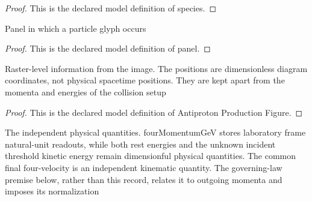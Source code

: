 \begin{proof}
  This is the declared model definition of species.
\end{proof}
\begin{definition}[panel]
  \label{def:physics:phyx-mini-0555:phyxminiproblems-problemphyxmini0555-figureparticleglyph-panel}
  Panel in which a particle glyph occurs
\end{definition}
\begin{proof}
  This is the declared model definition of panel.
\end{proof}
\begin{definition}
  \label{def:physics:phyx-mini-0555:phyxminiproblems-problemphyxmini0555-antiprotonproductionfigure}
  Raster-level information from the image. The positions are dimensionless diagram coordinates, not physical spacetime positions. They are kept apart from the momenta and energies of the collision setup
\end{definition}
\begin{proof}
  This is the declared model definition of Antiproton Production Figure.
\end{proof}
\begin{definition}
  \label{def:physics:phyx-mini-0555:phyxminiproblems-problemphyxmini0555-fixedtargetantiprotonsetup}
  The independent physical quantities. fourMomentumGeV stores laboratory frame natural-unit readouts, while both rest energies and the unknown incident threshold kinetic energy remain dimensionful physical quantities. The common final four-velocity is an independent kinematic quantity. The governing-law premise below, rather than this record, relates it to outgoing momenta and imposes its normalization
\end{definition}
